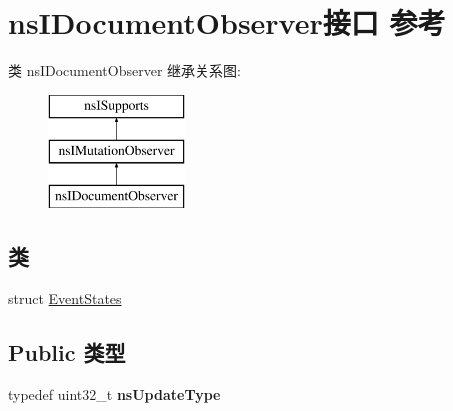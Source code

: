 \hypertarget{interfacens_i_document_observer}{}\section{ns\+I\+Document\+Observer接口 参考}
\label{interfacens_i_document_observer}
类 ns\+I\+Document\+Observer 继承关系图\+:\begin{figure}[H]
\begin{center}
\leavevmode
\includegraphics[height=3.000000cm]{interfacens_i_document_observer}
\end{center}
\end{figure}
\subsection*{类}
\begin{DoxyCompactItemize}
\item 
struct \hyperlink{structns_i_document_observer_1_1_event_states}{Event\+States}
\end{DoxyCompactItemize}
\subsection*{Public 类型}
\begin{DoxyCompactItemize}
\item 
\mbox{\label{interfacens_i_document_observer_a622e0b8b36baa0fab139f543d4ed5bd1}} 
typedef uint32\+\_\+t {\bfseries ns\+Update\+Type}
\end{DoxyCompactItemize}
